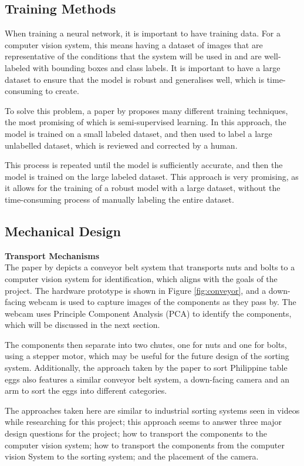 \subsection{Training Methods}
When training a neural network, it is important to have training data. For a computer vision system, this means having a dataset of images that are representative of the conditions that the system will be used in and
are well-labeled with bounding boxes and class labels. It is important to have a large dataset to ensure that the model is robust and generalises well, which is time-consuming to create.

To solve this problem, a paper by \citet{Yang_2023} proposes many different training techniques, the most promising of which is semi-supervised learning. In this approach, the model is trained on a small labeled dataset, and then
used to label a large unlabelled dataset, which is reviewed and corrected by a human.

This process is repeated until the model is sufficiently accurate, and then the model is trained on the large labeled dataset. This approach
is very promising, as it allows for the training of a robust model with a large dataset, without the time-consuming process of manually labeling the entire dataset.

\subsection{Mechanical Design}

\noindent
\textbf{Transport Mechanisms} \\
The paper by \citet{Dhenge2013MechanicalNS} depicts a conveyor belt system that transports nuts and bolts to a computer vision system for identification, which aligns with the goals of the project. 
The hardware prototype is shown in Figure \ref{fig:conveyor}, and a down-facing webcam is used to capture images of the components as they pass by. The webcam uses Principle Component Analysis (PCA) to identify the components,
which will be discussed in the next section.

The components then separate into two chutes, one for nuts and one for bolts, using a stepper motor, which may be useful for the future design of the sorting system.
Additionally, the approach taken by the paper \citet{eggsorting} to sort Philippine table eggs also features a similar conveyor belt system, a down-facing camera and an arm to sort the eggs into different categories. 

The approaches taken here are similar to industrial sorting systems seen in videos while researching for this project; this approach seems to answer three major design questions for the project;
how to transport the components to the computer vision system; how to transport the components from the computer vision System to the sorting system; and the placement of the camera.

